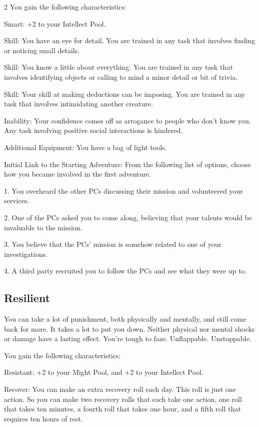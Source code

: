 \begin{multicols}{2}
You gain the following characteristics:

Smart: +2 to your Intellect Pool.

Skill: You have an eye for detail. You are trained in any task that involves finding or noticing small details.

Skill: You know a little about everything. You are trained in any task that involves identifying objects or calling to mind a minor detail or bit of trivia.

Skill: Your skill at making deductions can be imposing. You are trained in any task that involves intimidating another creature.

Inability: Your confidence comes off as arrogance to people who don’t know you. Any task involving positive social interactions is hindered.

Additional Equipment: You have a bag of light tools.

Initial Link to the Starting Adventure: From the following list of options, choose how you became involved in the first adventure.

1. You overheard the other PCs discussing their mission and volunteered your services.

2. One of the PCs asked you to come along, believing that your talents would be invaluable to the mission. 

3. You believe that the PCs’ mission is somehow related to one of your investigations.

4. A third party recruited you to follow the PCs and see what they were up to.

\subsection{Resilient}

You can take a lot of punishment, both physically and mentally, and still come back for more. It takes a lot to put you down. Neither physical nor mental shocks or damage have a lasting effect. You’re tough to faze. Unflappable. Unstoppable.

You gain the following characteristics:

Resistant: +2 to your Might Pool, and +2 to your Intellect Pool.

Recover: You can make an extra recovery roll each day. This roll is just one action. So you can make two recovery rolls that each take one action, one roll that takes ten minutes, a fourth roll that takes one hour, and a fifth roll that requires ten hours of rest.


\end{multicols}
